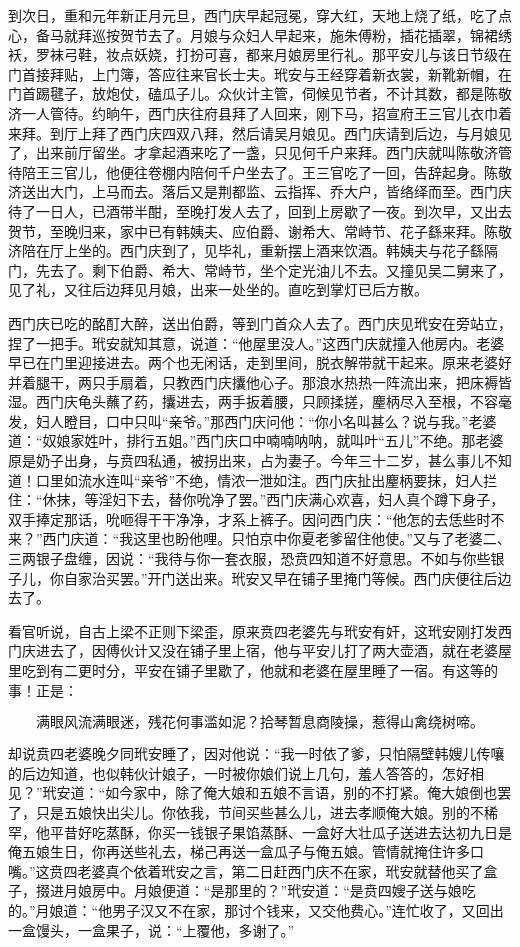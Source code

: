 到次日，重和元年新正月元旦，西门庆早起冠冕，穿大红，天地上烧了纸，吃了点心，备马就拜巡按贺节去了。月娘与众妇人早起来，施朱傅粉，插花插翠，锦裙绣袄，罗袜弓鞋，妆点妖娆，打扮可喜，都来月娘房里行礼。那平安儿与该日节级在门首接拜贴，上门簿，答应往来官长士夫。玳安与王经穿着新衣裳，新靴新帽，在门首踢毽子，放炮仗，磕瓜子儿。众伙计主管，伺候见节者，不计其数，都是陈敬济一人管待。约晌午，西门庆往府县拜了人回来，刚下马，招宣府王三官儿衣巾着来拜。到厅上拜了西门庆四双八拜，然后请吴月娘见。西门庆请到后边，与月娘见了，出来前厅留坐。才拿起酒来吃了一盏，只见何千户来拜。西门庆就叫陈敬济管待陪王三官儿，他便往卷棚内陪何千户坐去了。王三官吃了一回，告辞起身。陈敬济送出大门，上马而去。落后又是荆都监、云指挥、乔大户，皆络绎而至。西门庆待了一日人，已酒带半酣，至晚打发人去了，回到上房歇了一夜。到次早，又出去贺节，至晚归来，家中已有韩姨夫、应伯爵、谢希大、常峙节、花子繇来拜。陈敬济陪在厅上坐的。西门庆到了，见毕礼，重新摆上酒来饮酒。韩姨夫与花子繇隔门，先去了。剩下伯爵、希大、常峙节，坐个定光油儿不去。又撞见吴二舅来了，见了礼，又往后边拜见月娘，出来一处坐的。直吃到掌灯已后方散。

西门庆已吃的酩酊大醉，送出伯爵，等到门首众人去了。西门庆见玳安在旁站立，捏了一把手。玳安就知其意，说道：“他屋里没人。”这西门庆就撞入他房内。老婆早已在门里迎接进去。两个也无闲话，走到里间，脱衣解带就干起来。原来老婆好并着腿干，两只手扇着，只教西门庆攮他心子。那浪水热热一阵流出来，把床褥皆湿。西门庆龟头蘸了药，攮进去，两手扳着腰，只顾揉搓，麈柄尽入至根，不容毫发，妇人瞪目，口中只叫“亲爷。”那西门庆问他：“你小名叫甚么？说与我。”老婆道：“奴娘家姓叶，排行五姐。”西门庆口中喃喃呐呐，就叫叶“五儿”不绝。那老婆原是奶子出身，与贲四私通，被拐出来，占为妻子。今年三十二岁，甚么事儿不知道！口里如流水连叫“亲爷”不绝，情浓一泄如注。西门庆扯出麈柄要抹，妇人拦住：“休抹，等淫妇下去，替你吮净了罢。”西门庆满心欢喜，妇人真个蹲下身子，双手捧定那话，吮咂得干干净净，才系上裤子。因问西门庆：“他怎的去恁些时不来？”西门庆道：“我这里也盼他哩。只怕京中你夏老爹留住他使。”又与了老婆二、三两银子盘缠，因说：“我待与你一套衣服，恐贲四知道不好意思。不如与你些银子儿，你自家治买罢。”开门送出来。玳安又早在铺子里掩门等候。西门庆便往后边去了。

看官听说，自古上梁不正则下梁歪，原来贲四老婆先与玳安有奸，这玳安刚打发西门庆进去了，因傅伙计又没在铺子里上宿，他与平安儿打了两大壶酒，就在老婆屋里吃到有二更时分，平安在铺子里歇了，他就和老婆在屋里睡了一宿。有这等的事！正是：

\[
满眼风流满眼迷，残花何事滥如泥？
拾琴暂息商陵操，惹得山禽绕树啼。
\]

却说贲四老婆晚夕同玳安睡了，因对他说：“我一时依了爹，只怕隔壁韩嫂儿传嚷的后边知道，也似韩伙计娘子，一时被你娘们说上几句，羞人答答的，怎好相见？”玳安道：“如今家中，除了俺大娘和五娘不言语，别的不打紧。俺大娘倒也罢了，只是五娘快出尖儿。你依我，节间买些甚么儿，进去孝顺俺大娘。别的不稀罕，他平昔好吃蒸酥，你买一钱银子果馅蒸酥、一盒好大壮瓜子送进去达初九日是俺五娘生日，你再送些礼去，梯己再送一盒瓜子与俺五娘。管情就掩住许多口嘴。”这贲四老婆真个依着玳安之言，第二日赶西门庆不在家，玳安就替他买了盒子，掇进月娘房中。月娘便道：“是那里的？”玳安道：“是贲四嫂子送与娘吃的。”月娘道：“他男子汉又不在家，那讨个钱来，又交他费心。”连忙收了，又回出一盒馒头，一盒果子，说：“上覆他，多谢了。”

